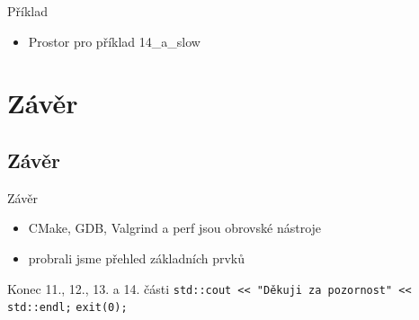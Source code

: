 \documentclass{beamer}
\begin{document}
\begin{xframe}{Příklad}
	\begin{itemize}
		\item Prostor pro příklad 14\_a\_slow
	\end{itemize}
\end{xframe}

\section{Závěr}
\subsection{Závěr}

\begin{xframe}{Závěr}
	\begin{itemize}
		\item CMake, GDB, Valgrind a perf jsou obrovské nástroje
		\item probrali jsme přehled základních prvků
	\end{itemize}
\end{xframe}




\begin{xframe}{Konec 11., 12., 13. a 14. části}
\texttt{std::cout << "Děkuji za pozornost"~<< std::endl;}
\texttt{exit(0);}
\end{xframe}
\end{document}
